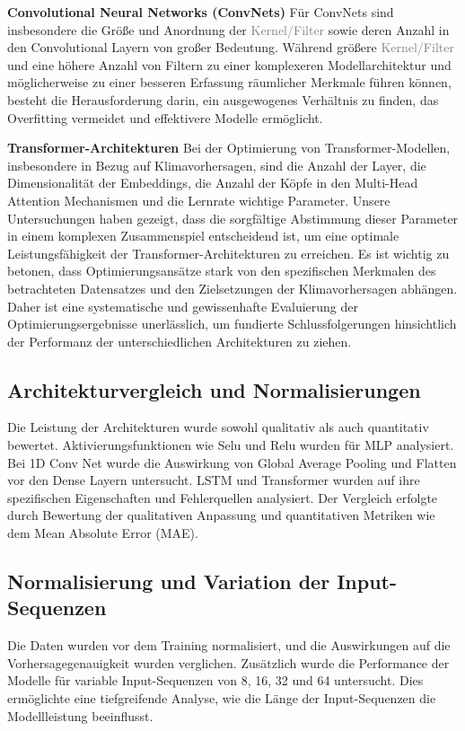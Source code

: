 \documentclass[manuscript,screen,review]{acmart}
\begin{document}
\textbf{Convolutional Neural Networks (ConvNets)}
Für ConvNets sind insbesondere die Größe und Anordnung der \textcolor{gray}{Kernel/Filter} sowie deren Anzahl in den Convolutional Layern von großer Bedeutung. 
Während größere \textcolor{gray}{Kernel/Filter} und eine höhere Anzahl von Filtern zu einer komplexeren Modellarchitektur und möglicherweise zu einer besseren Erfassung räumlicher Merkmale führen können, 
besteht die Herausforderung darin, ein ausgewogenes Verhältnis zu finden, das Overfitting vermeidet und effektivere Modelle ermöglicht.

\textbf{Transformer-Architekturen}
Bei der Optimierung von Transformer-Modellen, insbesondere in Bezug auf Klimavorhersagen, sind die Anzahl der Layer, die Dimensionalität der Embeddings, die Anzahl der Köpfe in den Multi-Head Attention Mechanismen und die Lernrate wichtige Parameter. Unsere Untersuchungen haben gezeigt, dass die sorgfältige Abstimmung dieser Parameter in einem komplexen Zusammenspiel entscheidend ist, um eine optimale Leistungsfähigkeit der Transformer-Architekturen zu erreichen.
Es ist wichtig zu betonen, dass Optimierungsansätze stark von den spezifischen Merkmalen des betrachteten Datensatzes und den Zielsetzungen der Klimavorhersagen abhängen. Daher ist eine systematische und gewissenhafte Evaluierung der Optimierungsergebnisse unerlässlich, um fundierte Schlussfolgerungen hinsichtlich der Performanz der unterschiedlichen Architekturen zu ziehen.


\subsection{Architekturvergleich und Normalisierungen}

Die Leistung der Architekturen wurde sowohl qualitativ als auch quantitativ bewertet. Aktivierungsfunktionen wie Selu und Relu wurden für MLP analysiert. Bei 1D Conv Net wurde die Auswirkung von Global Average Pooling und Flatten vor den Dense Layern untersucht. LSTM und Transformer wurden auf ihre spezifischen Eigenschaften und Fehlerquellen analysiert. Der Vergleich erfolgte durch Bewertung der qualitativen Anpassung und quantitativen Metriken wie dem Mean Absolute Error (MAE).


\subsection{Normalisierung und Variation der Input-Sequenzen}

Die Daten wurden vor dem Training normalisiert, und die Auswirkungen auf die Vorhersagegenauigkeit wurden verglichen. Zusätzlich wurde die Performance der Modelle für variable Input-Sequenzen von 8, 16, 32 und 64 untersucht. Dies ermöglichte eine tiefgreifende Analyse, wie die Länge der Input-Sequenzen die Modellleistung beeinflusst.
\end{document}

